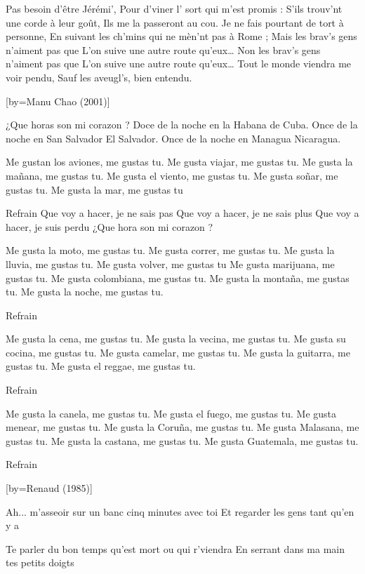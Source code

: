 \beginverse
Pas besoin d'être Jérémi’,
Pour d’viner l’ sort qui m'est promis :
S'ils trouv’nt une corde à leur goût,
Ils me la passeront au cou.
Je ne fais pourtant de tort à personne,
En suivant les ch’mins qui ne mèn’nt pas à Rome ;
Mais les brav’s gens n'aiment pas que
L'on suive une autre route qu'eux…
Non les brav’s gens n'aiment pas que
L'on suive une autre route qu'eux…
Tout le monde viendra me voir pendu,
Sauf les aveugl’s, bien entendu.
\endverse

[by={Manu Chao (2001)}]

¿Que horas son mi corazon ?
Doce de la noche en la Habana de Cuba.
Once de la noche en San Salvador El Salvador.
Once de la noche en Managua Nicaragua.

\beginverse
Me gustan los aviones, me gustas tu.
Me gusta viajar, me gustas tu.
Me gusta la mañana, me gustas tu.
Me gusta el viento, me gustas tu.
Me gusta soñar, me gustas tu.
Me gusta la mar, me gustas tu
\endverse

\beginverse
Refrain
Que voy a hacer, je ne sais pas
Que voy a hacer, je ne sais plus
Que voy a hacer, je suis perdu
¿Que hora son mi corazon ?
\endverse

\beginverse
Me gusta la moto, me gustas tu.
Me gusta correr, me gustas tu.
Me gusta la lluvia, me gustas tu.
Me gusta volver, me gustas tu
Me gusta marijuana, me gustas tu.
Me gusta colombiana, me gustas tu.
Me gusta la montaña, me gustas tu.
Me gusta la noche, me gustas tu.
\endverse

\beginverse
Refrain
\endverse

\beginverse
Me gusta la cena, me gustas tu.
Me gusta la vecina, me gustas tu.
Me gusta su cocina, me gustas tu.
Me gusta camelar, me gustas tu.
Me gusta la guitarra, me gustas tu.
Me gusta el reggae, me gustas tu.
\endverse

\beginverse
Refrain
\endverse

\beginverse
Me gusta la canela, me gustas tu.
Me gusta el fuego, me gustas tu.
Me gusta menear, me gustas tu.
Me gusta la Coruña, me gustas tu.
Me gusta Malasana, me gustas tu.
Me gusta la castana, me gustas tu.
Me gusta Guatemala, me gustas tu.
\endverse

\beginverse
Refrain
\endverse

[by={Renaud (1985)}]

\beginverse
Ah... m'asseoir sur un banc cinq minutes avec toi
Et regarder les gens tant qu'en y a
\endverse

\beginverse
Te parler du bon temps qu'est mort ou qui r'viendra
En serrant dans ma main tes petits doigts
\endverse

